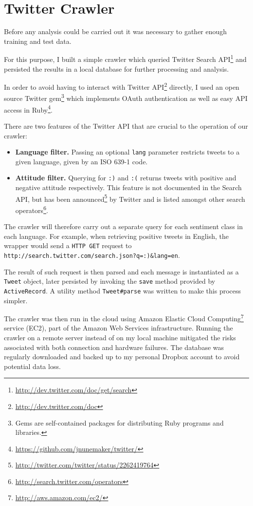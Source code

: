 \section{Twitter Crawler}

Before any analysis could be carried out it was necessary to gather enough training and test data.

For this purpose, I built a simple crawler which queried Twitter Search API\footnote{\url{http://dev.twitter.com/doc/get/search}} and persisted the results in a local database for further processing and analysis.

In order to avoid having to interact with Twitter API\footnote{\url{http://dev.twitter.com/doc}} directly, I used an open source Twitter gem\footnote{Gems are self-contained packages for distributing Ruby programs and libraries.} which implements OAuth authentication as well as easy API access in Ruby\footnote{\url{https://github.com/jnunemaker/twitter/}}.

There are two features of the Twitter API that are crucial to the operation of our crawler:

\begin{itemize}
  \item {\bf Language filter.} Passing an optional \verb|lang| parameter restricts tweets to a given language, given by an ISO 639-1 code.
  \item {\bf Attitude filter.} Querying for \verb|:)| and \verb|:(| returns tweets with positive and negative attitude respectively. This feature is not documented in the Search API, but has been announced\footnote{\url{http://twitter.com/twitter/status/2262419764}} by Twitter and is listed amongst other search operators\footnote{\url{http://search.twitter.com/operators}}.
\end{itemize}

The crawler will therefore carry out a separate query for each sentiment class in each language. For example, when retrieving positive tweets in English, the wrapper would send a \verb|HTTP GET| request to \verb|http://search.twitter.com/search.json?q=:)&lang=en|.

The result of such request is then parsed and each message is instantiated as a \verb|Tweet| object, later persisted by invoking the \verb|save| method provided by \verb|ActiveRecord|. A utility method \verb|Tweet#parse| was written to make this process simpler.

The crawler was then run in the cloud using Amazon Elastic Cloud Computing\footnote{\url{http://aws.amazon.com/ec2/}} service (EC2), part of the Amazon Web Services infrastructure. Running the crawler on a remote server instead of on my local machine mitigated the risks associated with both connection and hardware failures. The database was regularly downloaded and backed up to my personal Dropbox account to avoid potential data loss.

